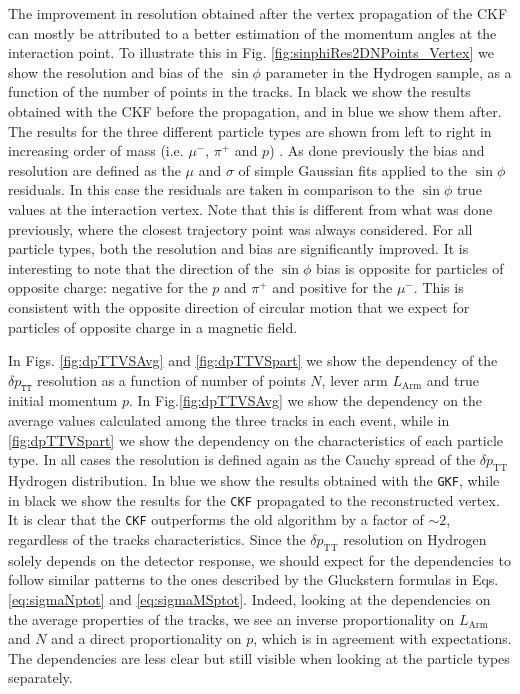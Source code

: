 The improvement in resolution obtained after the vertex propagation of the CKF can mostly be attributed to a better estimation of the momentum angles at the interaction point. To illustrate this in Fig. \ref{fig:sinphiRes2DNPoints_Vertex} we show the resolution and bias of the $\sin\phi$ parameter in the Hydrogen sample, as a function of the number of points in the tracks. In black we show the results obtained with the CKF before the propagation, and in blue we show them after. The results for the three different particle types are shown from left to right in increasing order of mass (i.e. $\mu^-$, $\pi^+$ and $p$) .  As done previously the bias and resolution are defined as the $\mu$ and $\sigma$ of simple Gaussian fits applied to the $\sin\phi$ residuals. In this case the residuals are taken in comparison to the $\sin\phi$ true values at the interaction vertex. Note that this is different from what was done previously, where the closest trajectory point was always considered. For all particle types, both the resolution and bias are significantly improved. It is interesting to note that the direction of the $\sin\phi$ bias is opposite for particles of opposite charge: negative for the $p$ and $\pi^+$ and positive for the $\mu^-$. This is consistent with the opposite direction of circular motion that we expect for particles of opposite charge in a magnetic field.

In Figs. \ref{fig:dpTTVSAvg} and \ref{fig:dpTTVSpart} we show the dependency of the $\delta p_\texttt{TT}$ resolution as a function of number of points $N$, lever arm $L_\text{Arm}$ and true initial momentum $p$. In Fig.\ref{fig:dpTTVSAvg} we show the dependency on the average values calculated among the three tracks in each event, while in \ref{fig:dpTTVSpart} we show the dependency on the characteristics of each particle type. In all cases the resolution is defined again as the Cauchy spread of the $\delta p_\text{TT}$ Hydrogen distribution. In blue we show the results obtained with the \texttt{GKF}, while in black we show the results for the \texttt{CKF} propagated to the reconstructed vertex. It is clear that the \texttt{CKF} outperforms the old algorithm by a factor of $\sim 2$, regardless of the tracks characteristics. Since the $\delta p_\text{TT}$ resolution on Hydrogen solely depends on the detector response, we should expect for the dependencies to follow similar patterns to the ones described by the Gluckstern formulas in Eqs. \ref{eq:sigmaNptot} and \ref{eq:sigmaMSptot}. Indeed, looking at the dependencies on the average properties of the tracks, we see an inverse proportionality on $L_\text{Arm}$ and $N$ and a direct proportionality on $p$, which is in agreement with expectations. The dependencies are less clear but still visible when looking at the particle types separately.

